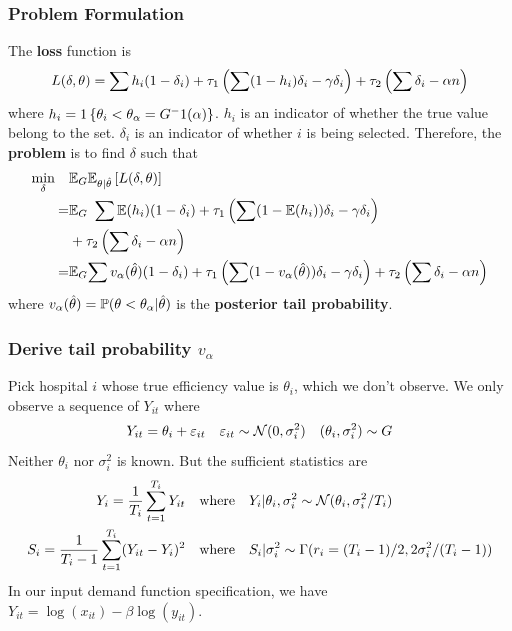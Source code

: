 \documentclass[10pt,mathserif,aspectratio=169]{beamer}
\begin{document}
\begin{frame}
  \frametitle{Problem Formulation}
  The \textbf{loss} function is
  \begin{equation*}
    L(\delta,\theta)=\sum h_i(1-\delta_i) +\tau_1\left(\sum (1-h_i)\delta_i -\gamma \delta_i\right) + \tau_2 \left(\sum \delta_i -\alpha n\right)
  \end{equation*} where $h_i=1\left\{\theta_i<\theta_{\alpha}=G^-1(\alpha)\right\}$. $h_i$ is an indicator of whether the true value belong to the set. $\delta_i$ is an indicator of whether $i$ is being selected.
  Therefore, the \textbf{problem} is to find $\delta$ such that
  \begin{align*}
    \min_{\delta} \quad & \mathbb{E}_G\mathbb{E}_{\theta|\hat{\theta}}\left[L(\delta,\theta)\right]                                                                                                       \\
    =                   & \mathbb{E}_G \ \sum \mathbb{E}(h_i)(1-\delta_i) +\tau_1\left(\sum (1-\mathbb{E}(h_i))\delta_i -\gamma \delta_i\right)                                                                    \\
                        & + \tau_2 \left(\sum \delta_i -\alpha n\right)                                                                                                                    \\
    =                   & \mathbb{E}_G{\sum v_\alpha(\hat{\theta})(1-\delta_i) +\tau_1\left(\sum (1-v_\alpha(\hat{\theta}))\delta_i -\gamma \delta_i\right) + \tau_2 \left(\sum \delta_i -\alpha n\right)}
  \end{align*}
  where $v_\alpha(\hat{\theta})=\mathbb{P}(\theta<\theta_\alpha|\hat{\theta})$ is the \textbf{posterior tail probability}.
\end{frame}

\begin{frame}[label=observation]
  \frametitle{Derive tail probability $v_\alpha$}
  Pick hospital $i$ whose true efficiency value is $\theta_i$, which we don't observe. We only observe a sequence of $Y_{it}$ where
  \begin{equation*}
    Y_{it} = \theta_i + \varepsilon_{it} \quad \varepsilon_{it} \sim \mathcal{N}(0,\sigma_i^2) \quad (\theta_i,\sigma_i^2) \sim G
  \end{equation*}
  Neither $\theta_i$ nor $\sigma_i^2$ is known. But the sufficient statistics are
  \begin{align*}
    Y_i=\frac{1}{T_i}\sum_{t=1}^{T_i}Y_{it}           & \quad \text{where}\quad Y_i|\theta_i,\sigma_i^2 \sim \mathcal{N}(\theta_i,\sigma_i^2/T_i)     \\
    S_i=\frac{1}{T_i-1}\sum_{t=1}^{T_i}(Y_{it}-Y_i)^2 & \quad \text{where} \quad S_i|\sigma_i^2 \sim \Gamma(r_i= (T_i-1)/2,2\sigma_i^2/(T_i-1))
  \end{align*}
  In our input demand function specification, we have $Y_{it}=\log(x_{it})-\beta\log(y_{it})$. \hyperlink{normality}{}
\end{frame}
\end{document}
